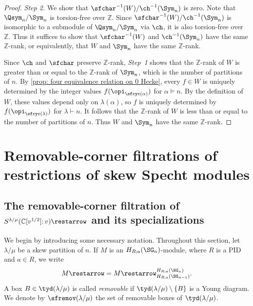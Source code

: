 \documentclass[12pt, reqno]{amsart}
\theoremstyle{plain}
\theoremstyle{definition}
\numberwithin{equation}{section}
\numberwithin{figure}{section}
\numberwithin{table}{section}
\def\Z{\mathbb Z}
\def\C{\mathbb C}
\begin{document}
\begin{proof}
{\it Step 2.} We show that $\sfchar^{-1}(W) / \ch^{-1}(\Sym_n)$ is zero.
Note that $\Qsym_n/\Sym_n$ is torsion-free over $\Z$.
Since $\sfchar^{-1}(W)/\ch^{-1}(\Sym_n)$ is isomorphic to a submodule of $\Qsym_n/\Sym_n$ via $\ch$, it is also torsion-free over $\Z$.
Thus it suffices to show that $\sfchar^{-1}(W)$ and $\ch^{-1}(\Sym_n)$ have the same $\Z$-rank, or equivalently, that $W$ and $\Sym_n$ have the same $\Z$-rank.


Since $\ch$ and $\sfchar$ preserve $\Z$-rank, {\it Step~1} shows that the $\Z$-rank of $W$ is greater than or equal to the $\Z$-rank of $\Sym_n$, which is the number of partitions of $n$.
By \cref{prop: four equivalence relation on 0 Hecke}, every $f \in W$ is uniquely determined by the integer values $f(\opi_{\sfcyc(\alpha)})$ for $\alpha \models n$.
By the definition of $W$, these values depend only on $\lambda(\alpha)$, so $f$ is uniquely determined by
$f(\opi_{\sfcyc(\lambda)})$ for $\lambda \vdash n$.
It follows that the $\Z$-rank of $W$ is less than or equal to the number of partitions of $n$.
Thus $W$ and $\Sym_n$ have the same $\Z$-rank.
\end{proof}










\section{Removable-corner filtrations of restrictions of skew Specht modules}\label{subsec:Relationship between restriction and specialization functors for skew Specht modules}

\subsection{The removable-corner filtration of $S^{\lambda/\mu}(\C[v^{1/2}];v)\restarrow$ and its specializations}


We begin by introducing some necessary notation. Throughout this section, let
$\lambda/\mu$ be a skew partition of  $n$. If $M$ is an
$H_{R;a}(\SG_n)$-module, where $R$ is a PID and $a \in R$, we write
\[
M\restarrow
=
M\restarrow^{H_{R;a}(\SG_n)}_{H_{R;a}(\SG_{n-1})}.
\]
A box $B \in \tyd(\lambda/\mu)$ is called \emph{removable} if
$\tyd(\lambda/\mu) \setminus \{B\}$ is a Young diagram. We denote by
$\sfremov(\lambda/\mu)$ the set of removable boxes of
$\tyd(\lambda/\mu)$.
\end{document}
